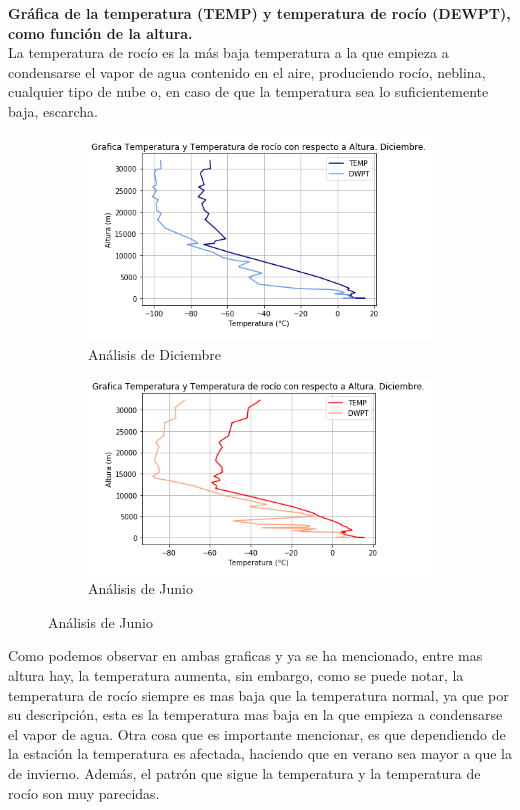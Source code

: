 \documentclass[12pt]{article}
\begin{document}
\noindent\textbf{Gráfica de la temperatura (TEMP) y temperatura de rocío (DEWPT), como función de la altura.} \\

La temperatura de rocío es la más baja temperatura a la que empieza a condensarse el vapor de agua contenido en el aire, produciendo rocío, neblina, cualquier tipo de nube o, en caso de que la temperatura sea lo suficientemente baja, escarcha. 

\begin{figure}[h!]
\begin{subfigure}{.55\textwidth}
  \centering
  \includegraphics[width=.8\linewidth]{GrafATTDec.png}
  \caption{Análisis de Diciembre}
  \label{fig:sfig1}
\end{subfigure}
\begin{subfigure}{.55\textwidth}
  \centering
  \includegraphics[width=.8\linewidth]{GrafATTJun.png}
  \caption{Análisis de Junio}
  \label{fig:sfig2}
\end{subfigure}
\end{figure}

Como podemos observar en ambas graficas y ya se ha mencionado, entre mas altura hay, la temperatura aumenta, sin embargo, como se puede notar, la temperatura de rocío siempre es mas baja que la temperatura normal, ya que por su descripción, esta es la temperatura mas baja en la que empieza a condensarse el vapor de agua. Otra cosa que es importante mencionar, es que dependiendo de la estación la temperatura es afectada, haciendo que en verano sea mayor a que la de invierno. Además, el patrón que sigue la temperatura y la temperatura de rocío son muy parecidas. \\
\end{document}

